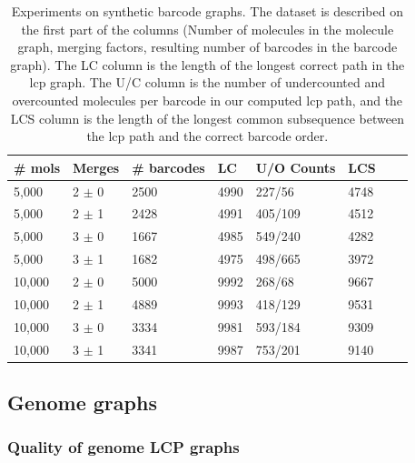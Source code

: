 \documentclass[a4paper,UKenglish,cleveref, autoref, thm-restate,authorcolumns]{lipics-v2019}
\begin{document}
\begin{table}
\begin{tabular}{|l|l|l||l|l|l||l|l|}
    \hline
    \# mols & Merges & \# barcodes & LC & U/O Counts & LCS \tabularnewline
    \hline
    \hline
    5,000 & 2 $\pm$ 0 & 2500 & 4990 & 227/56 & 4748  \tabularnewline
    \hline
    5,000 & 2 $\pm$ 1 & 2428 & 4991 & 405/109 & 4512  \tabularnewline
    \hline
    5,000 & 3 $\pm$ 0 & 1667 & 4985 & 549/240 & 4282 \tabularnewline
    \hline
    5,000 & 3 $\pm$ 1 & 1682 & 4975 & 498/665 & 3972 \tabularnewline
    \hline
    10,000 & 2 $\pm$ 0 & 5000 & 9992 & 268/68 & 9667  \tabularnewline
    \hline
    10,000 & 2 $\pm$ 1 & 4889 & 9993 & 418/129 & 9531  \tabularnewline
    \hline
    10,000 & 3 $\pm$ 0 & 3334 & 9981 & 593/184 & 9309  \tabularnewline
    \hline
    10,000 & 3 $\pm$ 1 & 3341 & 9987 & 753/201 & 9140  \tabularnewline
    \hline
 \end{tabular}
\caption{Experiments on synthetic barcode graphs. The dataset is described on the first part of the columns (Number of molecules in the molecule graph, merging factors, resulting number of barcodes in the barcode graph). The LC column is the length of the longest correct path in the lcp graph. The U/C column is the number of undercounted and overcounted molecules per barcode in our computed lcp path, and the LCS column is the length of the longest common subsequence between the lcp path and the correct barcode order.
\label{tab:synthetic_results}}
\end{table}

\subsection{Genome graphs}

\subsubsection*{Quality of genome LCP graphs}
\end{document}
